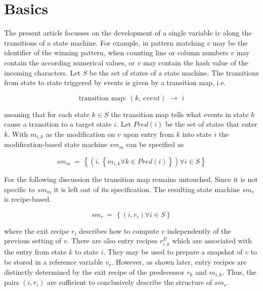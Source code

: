 \documentclass[12pt,a4paper]{scrartcl}
\begin{document}
%
\section{Basics}

The present article focusses on the development of a single variable i$v$ along
the transitions of a state machine. For example, in pattern matching $v$ may be
the identifier of the winning pattern, when counting line or column numbers $v$
may contain the according numerical values, or $v$ may contain the hash value
of the incoming characters.  Let $S$ be the set of states of a state machine.
The transitions from state to state triggered by events is given by a
transition map, i.e.

\begin{equation}
    \mbox{transition map:}\,\,(k,\,event)\,\,\longrightarrow\,\,i
\end{equation}

meaning that for each state $k\in S$ the transition map tells what events in
state $k$ cause a transition to a target state $i$.  Let $Pred(i)$ be the set
of states that enter $k$. With $m_{i,k}$ as the modification on $v$ upon entry
from $k$ into state $i$ the modification-based state machine $sm_{m}$ can be
specified as

\begin{equation}
    sm_m\,=\,\left \{ (i, \left \{m_{i,k}\forall k\in Pred(i) \right \}) \forall i\in S \right \} 
\end{equation}

For the following discussion the transition map remains untouched. Since it is
not specific to $sm_m$ it is left out of its specification. The resulting 
state machine $sm_r$ is recipe-based.

\begin{equation}
    sm_r\,=\,\left \{ (i, r_i) \forall i\in S \right \} 
\end{equation}

where the exit recipe $r_i$ describes how to compute $v$ independently of the
previous setting of $v$. There are also entry recipes $r^E_{i,k}$ which are
associated with the entry from state $k$ to state $i$. They may be used to
prepare a snapshot of $v$ to be stored in a reference variable $v_r$. However,
as shown later, entry recipes are distinctly determined by the exit recipe of
the predecessor $r_k$ and $m_{i,k}$. Thus, the pairs $(i,r_i)$ are sufficient
to conclusively describe the structure of $sm_r$.
\end{document}
